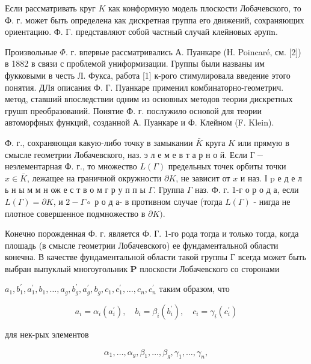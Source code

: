 \documentclass[10pt]{article}
\begin{document}
Если рассматривать круг $K$ как конформную модель плоскости Лобачевского, то Ф. г. может быть определена как дискретная группа его движений, сохраняющих ориентацию. Ф. Г. представляют собой частный случай клейновых әрупn.



Произвольные $\Phi$. г. впервые рассматривались А. Пуанкаре (Н. Poincaré, см. [2]) в 1882 в связи с проблемой униформизации. Группы были названы им фукковыми в честь Л. Фукса, работа [1] к-рого стимулировала введение этого понятия. ДЛя описания Ф. Г. Пуанкаре применил комбинаторно-геометрич. метод, ставший впоследствии одним из основных методов теории дискретных грушп преобразований. Понятие Ф. г. послужило основой для теории автоморфных функций, созданной А. Пуанкаре и Ф. Клейном (F. Klein).



Ф. г., сохраняющая какую-либо точку в замыкании $\bar{K}$ круга $K$ или прямую в смысле геометрии Лобачевского, наз. э л е м е в т а р н о й. Если $Г-$ неэлементарная Ф. г., то множество $L(\Gamma)$ предельных точек орбиты точки $x \in \bar{K}$, лежащее на граничной окружности $\partial K$, не зависит от $x$ и наз. І $\mathrm{p}$ е д е л ь н ы м м н ож е с т в о м г р у п п ы $\Gamma$. Группа $\Gamma$ наз. Ф. г. 1-г о р о д а, если $L(\Gamma)=\partial K$, и $2-\Gamma \circ$ р о д а- в противном случае (тогда $L(\Gamma)$ - нигда не плотное совершенное подмножество в $\partial K)$.



Конечно порожденная Ф. г. является Ф. Г. 1-го рода тогда и только тогда, когда плошадь (в смысле геометрии Лобачевского) ее фундаментальной области конечна. В качестве фундаментальной области такой группы Г всегда может быть выбран выпуклый многоугольник $\boldsymbol{P}$ плоскости Лобачевского со сторонами



$a_{1}, b_{1}^{\prime}, a_{1}^{\prime}, b_{1}, \ldots, a_{g}, b_{g}^{\prime}, a_{g}^{\prime}, b_{g}, c_{1}, c_{1}^{\prime}, \ldots, c_{n}, c_{n}^{\prime}$ таким образом, что



\[

a_{i}=\alpha_{i}\left(a_{i}^{\prime}\right), \quad b_{i}=\beta_{i}\left(b_{i}^{\prime}\right), \quad c_{i}=\gamma_{i}\left(c_{i}^{\prime}\right)

\]



для нек-рых элементов



\[

\alpha_{1}, \ldots, \alpha_{g}, \beta_{1}, \ldots, \beta_{g}, \gamma_{1}, \ldots, \gamma_{n},

\]
\end{document}
